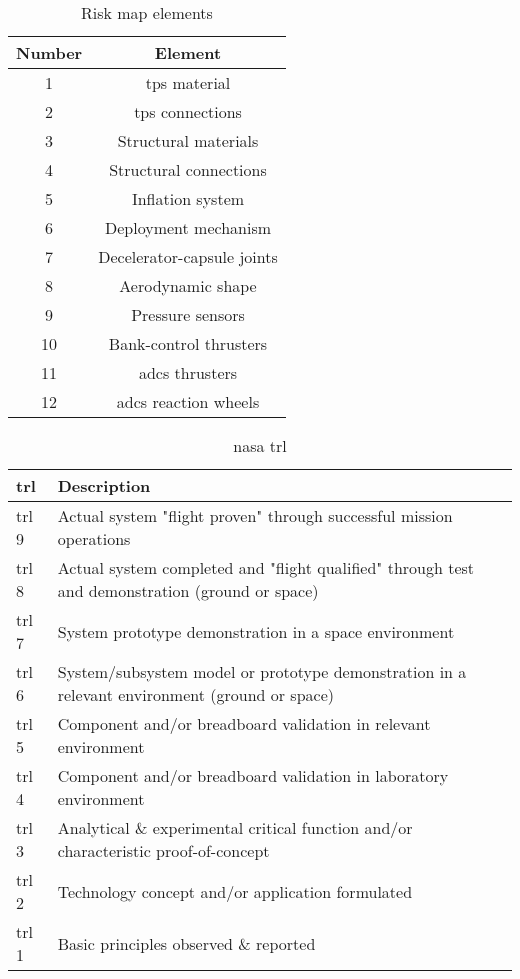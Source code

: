 \begin{table}[h]
	\centering
	\caption{Risk map elements}
	\label{tab:riskmapelements}
	\begin{tabular}{|c|c|}
		\hline 
		\textbf{Number} & \textbf{Element} \\ \hline \hline
		1 & \acrlong{tps} material \\
		2 & \acrlong{tps} connections\\
		3 & Structural materials\\
		4 & Structural connections\\
		5 & Inflation system \\	
		6 & Deployment mechanism\\
		7 & Decelerator-capsule joints\\
		8 & Aerodynamic shape\\
		9 & Pressure sensors\\
		10 & Bank-control thrusters\\
		11 & \gls{adcs} thrusters\\
		12 & \gls{adcs} reaction wheels\\
		\hline
	\end{tabular}
\end{table}

\begin{table}[h]
	\caption[\acrshort{nasa} \acrlong{trl}]{\acrshort{nasa} \acrlong{trl} \cite{NASA2007}}
	\begin{tabular}{|p{}|p{}|}
		\hline
		\textbf{\acrfull{trl}} & \textbf{Description} \\ \hline \hline
		\gls{trl} 9& Actual system "flight proven" through successful mission operations\\
		\gls{trl} 8& Actual system completed and "flight qualified" through test and demonstration (ground or space)\\
		\gls{trl} 7& System prototype demonstration in a space environment\\
		\gls{trl} 6& System/subsystem model or prototype demonstration in a relevant environment (ground or space)\\
		\gls{trl} 5& Component and/or breadboard validation in relevant environment\\
		\gls{trl} 4& Component and/or breadboard validation in laboratory environment\\
		\gls{trl} 3& Analytical \& experimental critical function and/or characteristic proof-of-concept\\
		\gls{trl} 2& Technology concept and/or application formulated\\
		\gls{trl} 1& Basic principles observed \& reported \\
		\hline
	\end{tabular}
	\label{tab:trls}
\end{table}